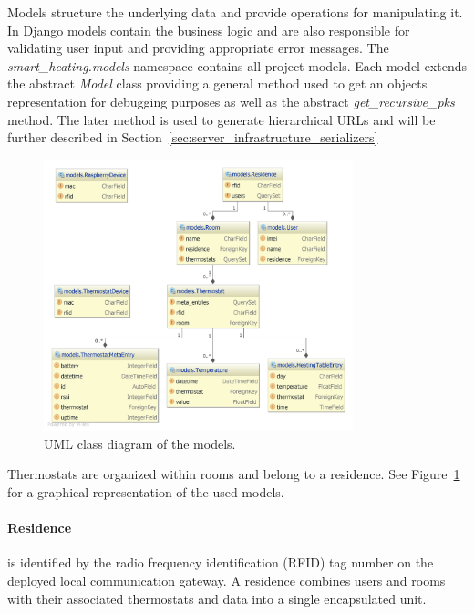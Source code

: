 Models structure the underlying data and provide operations for manipulating it.
In Django models contain the business logic and are also responsible for validating user input and providing appropriate error messages.
The \emph{smart\_heating.models} namespace contains all project models.
Each model extends the abstract \emph{Model} class providing a general method used to get an objects representation for debugging purposes as well as the abstract \emph{get\_recursive\_pks} method.
The later method is used to generate hierarchical URLs and will be further described in Section~\ref{sec:server_infrastructure_serializers}

\begin{figure}[h]
\begin{center}
\includegraphics[width=0.8\textwidth]{images/uml_class_diagram_pycharm_highres.png}
\end{center}
\caption{UML class diagram of the models.}
\label{fig:class_diagram}
\end{figure}

Thermostats are organized within rooms and belong to a residence. See Figure~\ref{fig:class_diagram} for a graphical representation of the used models.

\paragraph{Residence}

is identified by the radio frequency identification (RFID) tag number on the deployed local communication gateway. A residence combines users and rooms with their associated thermostats and data into a single encapsulated unit.

